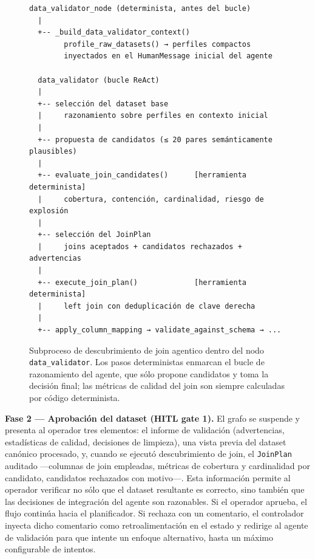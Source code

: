 \begin{figure}[H]
\centering
\begin{Verbatim}[fontsize=\small]
  data_validator_node (determinista, antes del bucle)
  |
  +-- _build_data_validator_context()
        profile_raw_datasets() → perfiles compactos
        inyectados en el HumanMessage inicial del agente

  data_validator (bucle ReAct)
  |
  +-- selección del dataset base
  |     razonamiento sobre perfiles en contexto inicial
  |
  +-- propuesta de candidatos (≤ 20 pares semánticamente plausibles)
  |
  +-- evaluate_join_candidates()      [herramienta determinista]
  |     cobertura, contención, cardinalidad, riesgo de explosión
  |
  +-- selección del JoinPlan
  |     joins aceptados + candidatos rechazados + advertencias
  |
  +-- execute_join_plan()             [herramienta determinista]
  |     left join con deduplicación de clave derecha
  |
  +-- apply_column_mapping → validate_against_schema → ...
\end{Verbatim}
\caption{Subproceso de descubrimiento de join agentico dentro del nodo \texttt{data\_validator}. Los pasos deterministas enmarcan el bucle de razonamiento del agente, que sólo propone candidatos y toma la decisión final; las métricas de calidad del join son siempre calculadas por código determinista.}
\label{fig:join-discovery-flow}
\end{figure}

\textbf{Fase 2 --- Aprobación del dataset (HITL gate 1).}
El grafo se suspende y presenta al operador tres elementos: el informe de validación (advertencias, estadísticas de calidad, decisiones de limpieza), una vista previa del dataset canónico procesado, y, cuando se ejecutó descubrimiento de join, el \texttt{JoinPlan} auditado —columnas de join empleadas, métricas de cobertura y cardinalidad por candidato, candidatos rechazados con motivo—. Esta información permite al operador verificar no sólo que el dataset resultante es correcto, sino también que las decisiones de integración del agente son razonables. Si el operador aprueba, el flujo continúa hacia el planificador. Si rechaza con un comentario, el controlador inyecta dicho comentario como retroalimentación en el estado y redirige al agente de validación para que intente un enfoque alternativo, hasta un máximo configurable de intentos.

